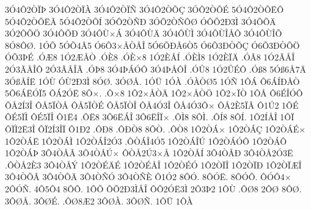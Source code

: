 {3^^d34^^d42^^d2^^cf^^de
3^^d34^^d42^^d2^^cf^^c0
3^^d34^^d42^^d2^^cf^^d1
3^^d34^^d42^^d2^^d5^^c7
3^^d3^^d42^^d2^^d5^^c9
5^^d34^^d42^^d2^^d5^^cb^^d4
5^^d34^^d42^^d2^^d5^^cb^^c3
5^^d34^^d42^^d2^^d5^^cd
3^^d3^^d42^^d2^^d1^^d0
3^^d3^^d42^^d2^^d1^^d4^^d8
^^d3^^d4^^d52^^d03^^cc
3^^d34^^d4^^d5^^c4
3^^d32^^d4^^d5^^d6
3^^d34^^d4^^d5^^d0
3^^d34^^d4^^d9^^d7^^c1
3^^d34^^d4^^d9^^c4
3^^d34^^d4^^d9^^cc
3^^d34^^d4^^d9^^ce^^c5^^d4
3^^d34^^d4^^d9^^ce^^d5
8^^d38^^d4^^d8.
1^^d3^^d5
5^^d3^^d54^^c25
^^d36^^d53^^d7^^c5^^d2^^c5^^ce
5^^d36^^d5^^d0^^c56^^d25
^^d36^^d53^^d0^^d2^^d5^^c7
^^d36^^d53^^d0^^d2^^d5^^d6
^^d3^^d53^^de^^c9
.^^d3^^c68
1^^d32^^c6^^c5^^d2
.^^d3^^c88
.^^d3^^c8^^d78
1^^d32^^c8^^c5^^cd
.^^d3^^c8^^cc8
1^^d32^^c8^^cf^^c4
.^^d3^^c38
1^^d32^^c3^^c5^^ce
2^^d33^^c3^^c5^^ce^^d4
2^^d33^^c3^^c5^^ce^^c3
.^^d3^^de8
3^^d34^^de^^c1^^d3^^d4
3^^d34^^de^^c5^^d4^^ce
.^^d3^^db8
1^^d32^^db^^c9^^d4
.^^d3^^df8
5^^d3^^df6^^c57^^c4
3^^d3^^df^^c5^^cd^^cb
1^^d3^^d9
^^d3^^d92^^d03^^cc
8^^d3^^d8.
3^^d3^^d8^^c5.
1^^d3^^dc
1^^d3^^c0
.^^d3^^c0^^d2^^d85
1^^d3^^d1
1^^d4^^c1
^^d46^^c1^^cd^^d0^^c5^^d2
5^^d46^^c1^^cb^^d3^^cf5
^^d4^^c12^^d3^^cb
8^^d4^^d7.
.^^d4^^d78
1^^d42^^d7^^c5^^d2^^c4
1^^d42^^d7^^c5^^d2^^d6
1^^d42^^d7^^cf^^d2
1^^d4^^c5
^^d46^^c9^^ce^^d3^^d4
^^d4^^c52^^cd3^^ce
^^d4^^c55^^cf^^d2^^c5
^^d4^^c55^^cf^^d2^^c9
^^d4^^c55^^cf^^d2^^ce
^^d4^^c54^^d33^^ce
^^d4^^c54^^d33^^d4^^d7
^^d4^^c52^^c85^^cf^^c2
^^d41^^da2
1^^d4^^c9
^^d4^^c95^^cf^^cc
^^d4^^c95^^cf^^ce
^^d41^^cb4
.^^d4^^cb8
3^^d46^^cb^^c1^^ce
3^^d46^^cb^^ce^^cf^^d7
.^^d4^^cc8
8^^d4^^cc.
.^^d4^^cd8
8^^d4^^cd.
1^^d42^^cd^^c5^^ce
1^^d4^^cf
^^d4^^cf^^cc2^^cb3^^ce
^^d4^^cf2^^cd3^^ce^^cf
^^d41^^d02
.^^d4^^d08
.^^d4^^d0^^d28
8^^d4^^d2.
.^^d4^^d28
1^^d42^^d2^^c1^^d7
1^^d42^^d2^^c1^^c7
1^^d42^^d2^^c1^^c9^^d7
1^^d42^^d2^^c1^^cb
1^^d42^^d2^^c1^^cc
1^^d42^^d2^^c1^^ce2^^d33
.^^d4^^d2^^c1^^ce4^^d35
1^^d42^^d2^^c1^^ce^^da
1^^d42^^d2^^c1^^d3^^d4
1^^d42^^d2^^c1^^d4
1^^d42^^d2^^c1^^de
3^^d44^^d2^^c5^^c2
3^^d44^^d2^^c5^^da^^d7
^^d4^^d2^^c52^^da3^^d7^^c5
1^^d42^^d2^^c5^^cd
3^^d44^^d2^^c5^^d0
3^^d44^^d2^^c52^^d33^^cb
.^^d4^^d2^^c52^^c83
3^^d44^^d2^^c5^^dd
1^^d42^^d2^^c9^^c4^^c9
1^^d42^^d2^^c9^^c5^^ce
1^^d42^^d2^^c9^^d3
1^^d42^^d2^^cf^^ce
1^^d42^^d2^^cf^^d0
1^^d42^^d2^^cf^^c6^^ce
3^^d44^^d2^^d5^^c2
3^^d44^^d2^^d5^^c4
3^^d44^^d2^^d1^^d3
3^^d44^^d2^^d1^^c8
^^d41^^d32
8^^d4^^d3.
8^^d4^^d3^^cb.
8^^d4^^d3^^d4.
^^d4^^d3^^d44^^d7
2^^d4^^d3^^d1.
4^^d45^^d44
8^^d4^^d4.
1^^d4^^d5
^^d4^^d52^^d03^^cc^^c5^^ce
^^d4^^d52^^d3^^cb3^^cc
2^^d43^^de2
1^^d4^^d9
.^^d4^^d88
2^^d4^^d8
8^^d4^^d8.
3^^d4^^d8^^c5.
3^^d4^^d8^^c9.
.^^d4^^d88^^c62
3^^d4^^d8^^c0.
3^^d4^^d8^^d1.
1^^d4^^dc
1^^d4^^c0
}
